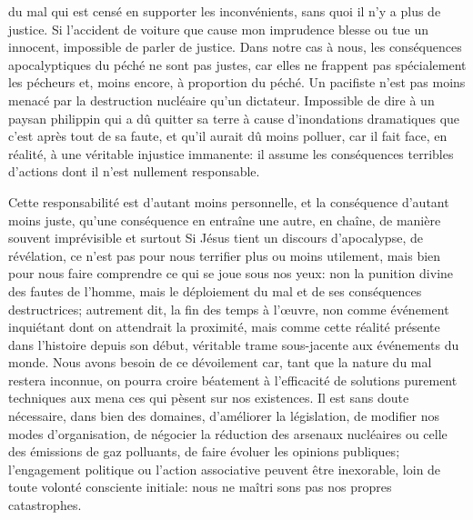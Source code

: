 \begin{singlequote}
du mal qui est censé en supporter les inconvénients, sans quoi il n'y a plus de justice. Si l'accident de voiture que cause mon imprudence blesse ou tue un innocent, impossible de parler de justice. Dans notre cas à nous, les conséquences apocalyptiques du péché ne sont pas justes, car elles ne frappent pas spécialement les pécheurs et, moins encore, à proportion du péché. Un pacifiste n'est pas moins menacé par la destruction nucléaire qu'un dictateur. Impossible de dire à un paysan philippin qui a dû quitter sa terre à cause d'inondations dramatiques que c'est après tout de sa faute, et qu'il aurait dû moins polluer, car il fait face, en réalité, à une véritable injustice immanente: il assume les conséquences terribles d'actions dont il n'est nullement responsable.

Cette responsabilité est d'autant moins personnelle, et la conséquence d'autant moins juste, qu'une conséquence en entraîne une autre, en chaîne, de manière souvent imprévisible et surtout Si Jésus tient un discours d'apocalypse, de révélation, ce n'est pas pour nous terrifier plus ou moins utilement, mais bien pour nous faire comprendre ce qui se joue sous nos yeux: non la punition divine des fautes de l'homme, mais le déploiement du mal et de ses conséquences destructrices; autrement dit, la fin des temps à l'œuvre, non comme événement inquiétant dont on attendrait la proximité, mais comme cette réalité présente dans l'histoire depuis son début, véritable trame sous-jacente aux événements du monde. Nous avons besoin de ce dévoilement car, tant que la nature du mal restera inconnue, on pourra croire béatement à l'efficacité de solutions purement techniques aux mena ces qui pèsent sur nos existences. Il est sans doute nécessaire, dans bien des domaines, d'améliorer la législation, de modifier nos modes d'organisation, de négocier la réduction des arsenaux nucléaires ou celle des émissions de gaz polluants, de faire évoluer les opinions publiques; l'engagement politique ou l'action associative peuvent être  inexorable, loin de toute volonté consciente initiale: nous ne maîtri sons pas nos propres catastrophes.
\end{singlequote}

